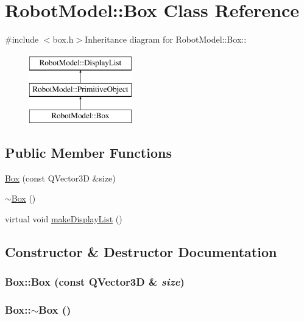 \hypertarget{class_robot_model_1_1_box}{
\section{RobotModel::Box Class Reference}
\label{class_robot_model_1_1_box}
}


{\ttfamily \#include $<$box.h$>$}Inheritance diagram for RobotModel::Box::\begin{figure}[H]
\begin{center}
\leavevmode
\includegraphics[height=3cm]{class_robot_model_1_1_box}
\end{center}
\end{figure}
\subsection*{Public Member Functions}
\begin{DoxyCompactItemize}
\item 
\hyperlink{class_robot_model_1_1_box_a4f394975b4dadbd1fa34d124f33772cb}{Box} (const QVector3D \&size)
\item 
\hyperlink{class_robot_model_1_1_box_a6a5e09398e85d602a046b429062fb9c2}{$\sim$Box} ()
\item 
virtual void \hyperlink{class_robot_model_1_1_box_a29420d81c8b3622c95a1976593e2cc4b}{makeDisplayList} ()
\end{DoxyCompactItemize}


\subsection{Constructor \& Destructor Documentation}
\hypertarget{class_robot_model_1_1_box_a4f394975b4dadbd1fa34d124f33772cb}{
\subsubsection[{Box}]{\setlength{\rightskip}{0pt plus 5cm}Box::Box (const QVector3D \& {\em size})}}
\label{class_robot_model_1_1_box_a4f394975b4dadbd1fa34d124f33772cb}
\hypertarget{class_robot_model_1_1_box_a6a5e09398e85d602a046b429062fb9c2}{
\subsubsection[{$\sim$Box}]{\setlength{\rightskip}{0pt plus 5cm}Box::$\sim$Box ()}}
\label{class_robot_model_1_1_box_a6a5e09398e85d602a046b429062fb9c2}


